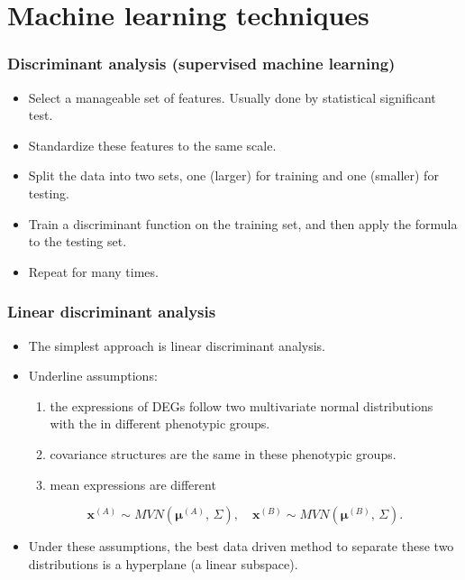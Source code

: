 \section{Machine learning techniques}

\begin{frame}
  \frametitle{Discriminant analysis (supervised machine learning)}
  \begin{itemize}
  \item Select a manageable set of features.  Usually done by
    statistical significant test.
  \item Standardize these features to the same scale.
  \item Split the data into two sets, one (larger) for training and
    one (smaller) for testing.
  \item Train a discriminant function on the training set, and then
    apply the formula to the testing set.
  \item Repeat for many times.
  \end{itemize}
\end{frame}

\begin{frame}
  \frametitle{Linear discriminant analysis}
  \begin{itemize}
  \item The simplest approach is linear discriminant analysis. 
  \item Underline assumptions:
    \begin{enumerate}
    \item the expressions of DEGs follow two multivariate normal
      distributions with the in different phenotypic groups.
    \item covariance structures are the same in these phenotypic groups.
    \item mean expressions are different
    \end{enumerate}
    \begin{equation}
      \label{eq:lda-model}
      \mathbf{x}^{(A)} \sim MVN\left(\bm{\mu}^{(A)},\, \Sigma\right), \quad \mathbf{x}^{(B)} \sim MVN\left(\bm{\mu}^{(B)},\, \Sigma\right).
    \end{equation}
  \item Under these assumptions, the best data driven method to
    separate these two distributions is a hyperplane (a linear
    subspace).
  \end{itemize}
\end{frame}

